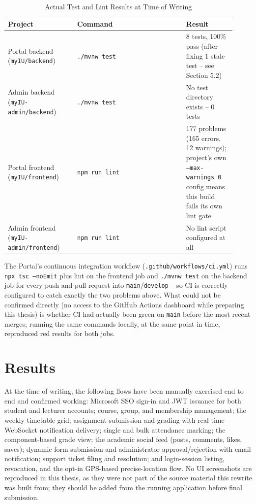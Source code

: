 \documentclass[12pt,a4paper]{report}
\begin{document}
\begin{longtable}{@{}p{0.28\linewidth}p{0.44\linewidth}p{0.20\linewidth}@{}}
\caption{Actual Test and Lint Results at Time of Writing}
\label{tab:test-results}\\
\toprule
\textbf{Project} & \textbf{Command} & \textbf{Result} \\
\midrule
\endhead
Portal backend (\texttt{myIU/backend}) & \texttt{./mvnw test} & 8 tests, 100\% pass (after fixing 1 stale test -- see Section 5.2) \\
Admin backend (\texttt{myIU-admin/backend}) & \texttt{./mvnw test} & No test directory exists -- 0 tests \\
Portal frontend (\texttt{myIU/frontend}) & \texttt{npm run lint} & 177 problems (165 errors, 12 warnings); project's own \texttt{--max-warnings 0} config means this build fails its own lint gate \\
Admin frontend (\texttt{myIU-admin/frontend}) & \texttt{npm run lint} & No lint script configured at all \\
\bottomrule
\end{longtable}

The Portal's continuous integration workflow (\texttt{.github/workflows/ci.yml})
runs \texttt{npx tsc --noEmit} plus lint on the frontend job and
\texttt{./mvnw test} on the backend job for every push and pull request
into \texttt{main}/\texttt{develop} -- so CI is correctly configured to
catch exactly the two problems above. What could not be confirmed
directly (no access to the GitHub Actions dashboard while preparing
this thesis) is whether CI had actually been green on \texttt{main}
before the most recent merges; running the same commands locally, at
the same point in time, reproduced red results for both jobs.

\section{Results}

At the time of writing, the following flows have been manually
exercised end to end and confirmed working: Microsoft SSO sign-in and
JWT issuance for both student and lecturer accounts; course, group, and
membership management; the weekly timetable grid; assignment submission
and grading with real-time WebSocket notification delivery; single and
bulk attendance marking; the component-based grade view; the academic
social feed (posts, comments, likes, saves); dynamic form submission
and administrator approval/rejection with email notification; support
ticket filing and resolution; and login-session listing, revocation,
and the opt-in GPS-based precise-location flow. No UI screenshots are
reproduced in this thesis, as they were not part of the source material
this rewrite was built from; they should be added from the running
application before final submission.
\end{document}

